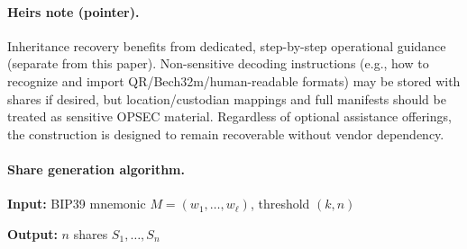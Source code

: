 \documentclass[11pt]{article}
\begin{document}
\paragraph{Heirs note (pointer).} Inheritance recovery benefits from dedicated, step-by-step operational guidance (separate from this paper). Non-sensitive decoding instructions (e.g., how to recognize and import QR/Bech32m/human-readable formats) may be stored with shares if desired, but location/custodian mappings and full manifests should be treated as sensitive OPSEC material. Regardless of optional assistance offerings, the construction is designed to remain recoverable without vendor dependency.

\paragraph{Share generation algorithm.}

\textbf{Input:} BIP39 mnemonic $M = (w_1, \ldots, w_\ell)$, threshold $(k, n)$

\textbf{Output:} $n$ shares $S_1, \ldots, S_n$
\end{document}
